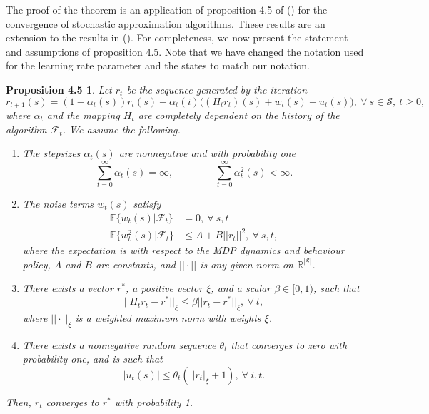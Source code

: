 The proof of the theorem is an application of proposition 4.5 of \citeauthor{Bertsekas:1996:NP:560669} (\citeyear{Bertsekas:1996:NP:560669}) for the convergence of stochastic approximation algorithms.
These results are an extension to the results in \citeauthor{Tsitsiklis1994} (\citeyear{Tsitsiklis1994}). 
For completeness, we now present the statement and assumptions of proposition 4.5.
Note that we have changed the notation used for the learning rate parameter and the states to match our notation.

\newtheorem*{proposition4.5*}{Proposition 4.5}
\begin{proposition4.5*}
Let $r_t$ be the sequence generated by the iteration
\begin{equation}
\label{eq:prop_update}
r_{t+1}(s) = (1 - \alpha_t(s)) r_t(s) + \alpha_t(i)\big( (H_t r_t) (s) + w_t(s) + u_t(s)  \big), \ \forall \ s \in \mathcal{S}, \ t \geq 0, 
\end{equation}
where $\alpha_t$ and the mapping $H_t$ are completely dependent on the history of the algorithm $\mathcal{F}_t$. 
We assume the following.

\begin{enumerate}
    \item The stepsizes $\alpha_t(s)$ are nonnegative and with probability one
\begin{equation*}
\sum^\infty_{t=0} \alpha_t(s) = \infty, \hspace{50pt}
	\sum^\infty_{t=0} \alpha^2_t(s) < \infty. 
\end{equation*}
\item The noise terms $w_t(s)$ satisfy 
\begin{align*}
\mathbb{E}\{ w_t(s) | \mathcal{F}_t \} &= 0, \ \forall \ s, t 
	\\
\mathbb{E}\{ w^2_t(s) | \mathcal{F}_t \} &\leq A + B || r_t ||^2, \ \forall \ s, t,
\end{align*}
where the expectation is with respect to the MDP dynamics and behaviour policy, $A$ and $B$ are constants, and $|| \cdot ||$ is any given norm on $\mathbb{R}^{|\mathcal{S}|}$.
\item There exists a vector $r^*$, a positive vector $\xi$, and a scalar $\beta \in [0,1)$, such that
\begin{equation*}
|| H_t r_t - r^* ||_\xi \leq \beta || r_t - r^* ||_\xi, \ \forall \ t,
\end{equation*}
where $|| \cdot ||_\xi$ is a weighted maximum norm with weights $\xi$.
\item There exists a nonnegative random sequence $\theta_t$ that converges to zero with probability one, and is such that
\begin{equation}
|u_t(s)| \leq \theta_t ( ||r_t|_\xi +1 ), \ \forall \ i,t. 
\end{equation}
\end{enumerate}
Then, $r_t$ converges to $r^*$ with probability 1.
\end{proposition4.5*}

